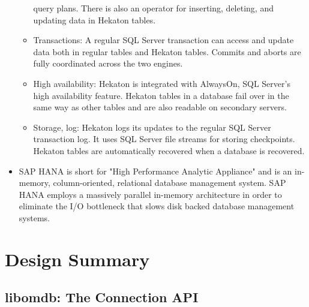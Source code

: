 \documentclass[letterpaper, 12pt]{article}
\begin{document}
\begin{itemize}
\begin{itemize}
		query plans. There is also an operator for inserting, deleting,
		and updating data in Hekaton tables.
		\item Transactions: A regular SQL Server transaction can access
		and update data both in regular tables and Hekaton tables.
		Commits and aborts are fully coordinated across the two engines.
		\item High availability: Hekaton is integrated with AlwaysOn,
		SQL Server’s high availability feature. Hekaton tables in a database
		fail over in the same way as other tables and are also
		readable on secondary servers.
		\item Storage, log: Hekaton logs its updates to the regular SQL
		Server transaction log. It uses SQL Server file streams for storing
		checkpoints. Hekaton tables are automatically recovered
		when a database is recovered. 
	  \end{itemize} \cite{hekaton}
	  
	  \item SAP HANA
	  is short for "High Performance Analytic Appliance" and is an in-memory,
	  column-oriented, relational database management system. SAP HANA employs a
	  massively parallel in-memory architecture in order to eliminate the I/O bottleneck
	  that slows disk backed database management systems.
	  \par\vspace{\baselineskip} 
	  \cite{saphana}
	  \par\vspace{\baselineskip}
	\end{itemize}	
	
\newpage

\section{Design Summary}
  \subsection{libomdb: The Connection API}
\newpage
\end{document}
